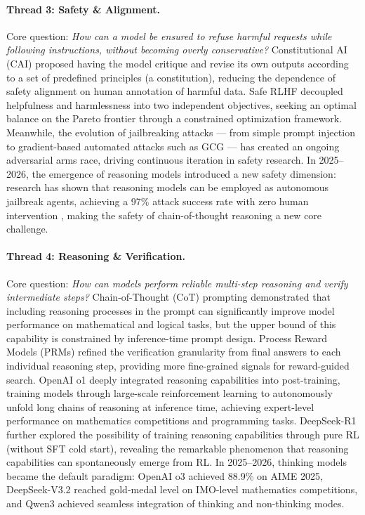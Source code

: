 \paragraph{Thread 3: Safety \& Alignment.}
Core question: \textit{How can a model be ensured to refuse harmful requests while following instructions, without becoming overly conservative?}
Constitutional AI (CAI) \cite{bai2022constitutional} proposed having the model critique and revise its own outputs
according to a set of predefined principles (a constitution),
reducing the dependence of safety alignment on human annotation of harmful data.
Safe RLHF \cite{dai2024saferlhf} decoupled helpfulness and harmlessness into two independent objectives,
seeking an optimal balance on the Pareto frontier through a constrained optimization framework.
Meanwhile, the evolution of jailbreaking attacks ---
from simple prompt injection to gradient-based automated attacks such as GCG \cite{zou2023gcg} ---
has created an ongoing adversarial arms race, driving continuous iteration in safety research.
In 2025--2026, the emergence of reasoning models introduced a new safety dimension:
research has shown that reasoning models can be employed as autonomous jailbreak agents,
achieving a 97\% attack success rate with zero human intervention \cite{hagendorff2026jailbreakagents},
making the safety of chain-of-thought reasoning a new core challenge.

\paragraph{Thread 4: Reasoning \& Verification.}
Core question: \textit{How can models perform reliable multi-step reasoning and verify intermediate steps?}
Chain-of-Thought (CoT) prompting \cite{wei2022cot} demonstrated that
including reasoning processes in the prompt can significantly improve model performance on mathematical and logical tasks,
but the upper bound of this capability is constrained by inference-time prompt design.
Process Reward Models (PRMs) \cite{lightman2023prm} refined the verification granularity from final answers to each individual reasoning step,
providing more fine-grained signals for reward-guided search.
OpenAI o1 \cite{openai2024o1} deeply integrated reasoning capabilities into post-training,
training models through large-scale reinforcement learning to autonomously unfold long chains of reasoning at inference time,
achieving expert-level performance on mathematics competitions and programming tasks.
DeepSeek-R1 \cite{deepseek2025r1} further explored
the possibility of training reasoning capabilities through pure RL (without SFT cold start),
revealing the remarkable phenomenon that reasoning capabilities can spontaneously emerge from RL.
In 2025--2026, thinking models became the default paradigm:
OpenAI o3 \cite{openai2025o3} achieved 88.9\% on AIME 2025,
DeepSeek-V3.2 \cite{deepseek2025v32} reached gold-medal level on IMO-level mathematics competitions,
and Qwen3 \cite{yang2025qwen3} achieved seamless integration of thinking and non-thinking modes.

